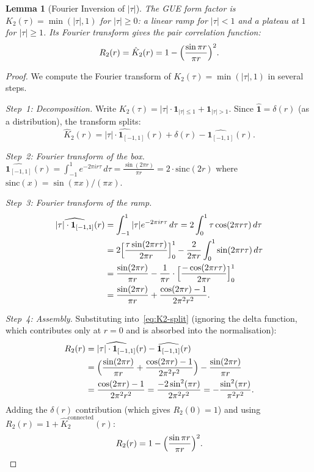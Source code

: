 \documentclass[11pt,a4paper]{article}
\theoremstyle{plain}
\newtheorem{lemma}[theorem]{Lemma}
\theoremstyle{remark}
\begin{document}
\begin{lemma}[Fourier Inversion of $|\tau|$]\label{lem:fourier-tau}
The GUE form factor is $K_2(\tau)=\min(|\tau|,1)$ for $|\tau|\geq 0$:
a linear ramp for $|\tau|<1$ and a plateau at $1$ for $|\tau|\geq 1$.
Its Fourier transform gives the pair correlation function:
\begin{equation}\label{eq:fourier-K2}
  R_2(r)=\hat{K}_2(r)=1-\Bigl(\frac{\sin\pi r}{\pi r}\Bigr)^2.
\end{equation}
\end{lemma}

\begin{proof}
We compute the Fourier transform of $K_2(\tau)=\min(|\tau|,1)$ in
several steps.

\emph{Step~1: Decomposition.}
Write $K_2(\tau)=|\tau|\cdot\mathbf{1}_{|\tau|\leq 1}+\mathbf{1}_{|\tau|>1}$.
Since $\hat{\mathbf{1}}=\delta(r)$ (as a distribution), the transform splits:
\begin{equation}\label{eq:K2-split}
  \hat{K}_2(r)=\widehat{|\tau|\cdot\mathbf{1}_{[-1,1]}}(r)+\delta(r)
  -\widehat{\mathbf{1}_{[-1,1]}}(r).
\end{equation}

\emph{Step~2: Fourier transform of the box.}
$\widehat{\mathbf{1}_{[-1,1]}}(r)=\int_{-1}^1 e^{-2\pi i r\tau}\,d\tau
=\frac{\sin(2\pi r)}{\pi r}=2\cdot\mathrm{sinc}(2r)$
where $\mathrm{sinc}(x)=\sin(\pi x)/(\pi x)$.

\emph{Step~3: Fourier transform of the ramp.}
\begin{align*}
  \widehat{|\tau|\cdot\mathbf{1}_{[-1,1]}}(r)
  &=\int_{-1}^1|\tau|e^{-2\pi i r\tau}\,d\tau
  =2\int_0^1\tau\cos(2\pi r\tau)\,d\tau\\
  &=2\Bigl[\frac{\tau\sin(2\pi r\tau)}{2\pi r}\Bigr]_0^1
  -\frac{2}{2\pi r}\int_0^1\sin(2\pi r\tau)\,d\tau\\
  &=\frac{\sin(2\pi r)}{\pi r}
  -\frac{1}{\pi r}\cdot\Bigl[\frac{-\cos(2\pi r\tau)}{2\pi r}\Bigr]_0^1\\
  &=\frac{\sin(2\pi r)}{\pi r}
  +\frac{\cos(2\pi r)-1}{2\pi^2 r^2}.
\end{align*}

\emph{Step~4: Assembly.}
Substituting into~\eqref{eq:K2-split} (ignoring the delta function, which
contributes only at $r=0$ and is absorbed into the normalisation):
\begin{align*}
  R_2(r)&=\widehat{|\tau|\cdot\mathbf{1}_{[-1,1]}}(r)
  -\widehat{\mathbf{1}_{[-1,1]}}(r)\\
  &=\Bigl(\frac{\sin(2\pi r)}{\pi r}+\frac{\cos(2\pi r)-1}{2\pi^2 r^2}\Bigr)
  -\frac{\sin(2\pi r)}{\pi r}\\
  &=\frac{\cos(2\pi r)-1}{2\pi^2 r^2}
  =\frac{-2\sin^2(\pi r)}{2\pi^2 r^2}
  =-\frac{\sin^2(\pi r)}{\pi^2 r^2}.
\end{align*}
Adding the $\delta(r)$ contribution (which gives $R_2(0)=1$) and
using $R_2(r)=1+\hat{K}_2^{\mathrm{connected}}(r)$:
\[
  R_2(r)=1-\Bigl(\frac{\sin\pi r}{\pi r}\Bigr)^2.\qedhere
\]
\end{proof}
\end{document}
